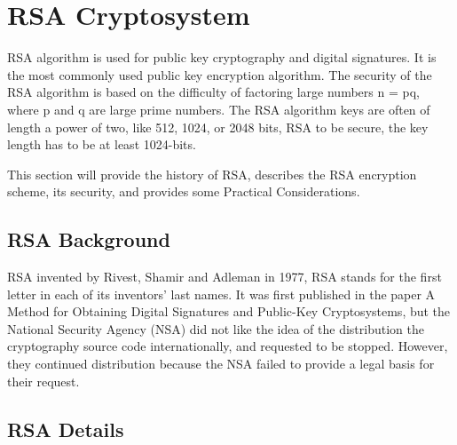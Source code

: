 \documentclass[12pt,journal,compsoc]{IEEEtran}
\begin{document}



\section{RSA Cryptosystem}
\label{sec:rsa-cryptosystem}


RSA algorithm is used for public key cryptography and digital
signatures. It is the most commonly used public key encryption
algorithm. The security of the RSA algorithm is based on the
difficulty of factoring large numbers n = pq, where p and q are large
prime numbers. The RSA algorithm keys are often of length a power of
two, like 512, 1024, or 2048 bits, RSA to be secure, the key length
has to be at least 1024-bits. 
\par
This section will provide the history of RSA, describes the RSA
encryption scheme, its security, and provides some Practical
Considerations. 
\par

\subsection{RSA Background}
\label{sec:rsa-background}

RSA invented by Rivest, Shamir and Adleman in 1977, RSA stands for the
first letter in each of its inventors' last names. It was first
published in the paper A Method for Obtaining Digital Signatures and
Public-Key Cryptosystems, but the National Security Agency (NSA) did
not like the idea of the distribution the cryptography source code
internationally, and requested to be stopped. However, they continued
distribution because the NSA failed to provide a legal basis for their
request.  
\par

\subsection{RSA Details}
\label{sec:rsa-details}
\end{document}
